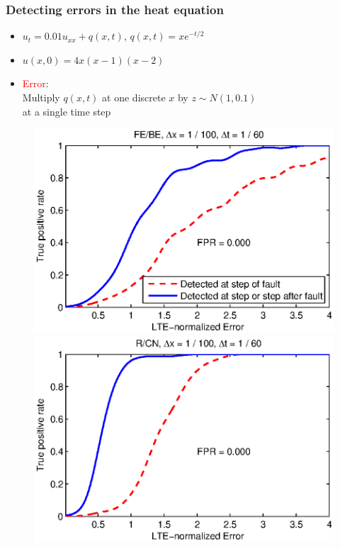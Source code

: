 \documentclass{beamer}
\begin{document}
\begin{frame}
\frametitle{Detecting errors in the heat equation}

\begin{itemize}
\item  $u_t = 0.01u_{xx} + q(x, t)$, \quad $q(x, t) = xe^{-t/2}$
\item  $u(x, 0) = 4x(x-1)(x-2)$
\item \textcolor{red}{Error}: \\
Multiply $q(x, t)$ at one discrete $x$ by $z \sim N(1, 0.1)$ \\
at a single time step
\end{itemize}

\vspace{-0.5cm}
\begin{figure}
  \includegraphics[scale=0.5]{figs/heat_1a_BE.eps}
  \includegraphics[scale=0.5]{figs/heat_1a_CN.eps}
\end{figure}

\end{frame}
\end{document}
